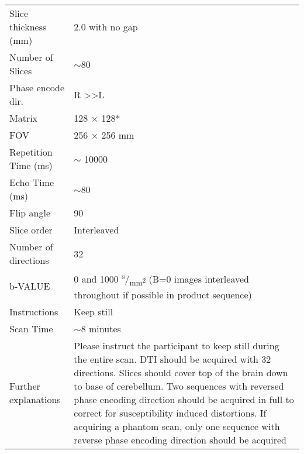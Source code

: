 \begin{tabularx}{\linewidth}{@{} s | X @{}}
Slice thickness (mm)      							& 2.0 with no gap                                                                      \\
Number of Slices          							& $\sim$80                                                                             \\
Phase encode dir.         							& R \textgreater{}\textgreater L                                                       \\
Matrix                    								& 128 $\times$ 128*                                                                             \\
FOV                       								& 256 $\times$ 256 mm                                                                           \\
Repetition Time (ms)      						& $\sim$ \num{10000}                                                                         \\
Echo Time (ms)            							& $\sim$80                                                                             \\
Flip angle                								& 90                                                                                   \\
Slice order               								& Interleaved                                                                          \\
Number of directions      						& 32                                                                                   \\
b-VALUE                   								& 0 and 1000 \textsuperscript{s}/\textsubscript{mm\textsuperscript{2}} (B=0 images interleaved throughout if possible in product sequence) \\
Instructions              							& Keep still                                                                           \\
Scan Time                 								& $\sim$8 minutes                                                                      \\
Further explanations      						& Please instruct the participant to keep still during the entire scan. \ac{DTI} should be acquired with 32 directions. Slices should cover top of the brain down to base of cerebellum. Two sequences with reversed phase encoding direction should be acquired in full to correct for susceptibility induced distortions. If acquiring a phantom scan, only one sequence with reverse phase encoding direction should be acquired                                                          \end{tabularx}

